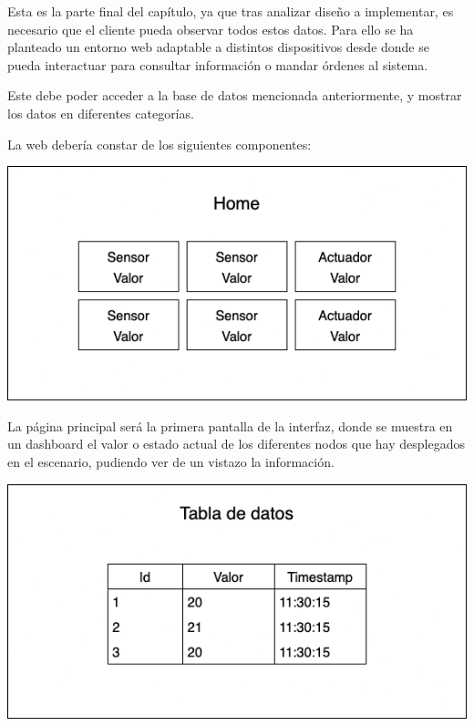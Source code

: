 Esta es la parte final del capítulo, ya que tras analizar diseño a implementar, es necesario que el cliente pueda observar todos estos datos. Para ello se ha planteado un entorno web adaptable a distintos dispositivos desde donde se pueda interactuar para consultar información o mandar órdenes al sistema.

Este debe poder acceder a la base de datos mencionada anteriormente, y mostrar los datos en diferentes categorías.

La web debería constar de los siguientes componentes:

\begin{center}
    \centering
    \includegraphics[width=\textwidth]{img/05-Web-home.png}
    \label{fig:home}
\end{center}

La página principal será la primera pantalla de la interfaz, donde se muestra en un dashboard el valor o estado actual de los diferentes nodos que hay desplegados en el escenario, pudiendo ver de un vistazo la información.

\begin{center}
    \centering
    \includegraphics[width=\textwidth]{img/05-Web-tablas.png}
    \label{fig:tablas-de-datos}
\end{center}

